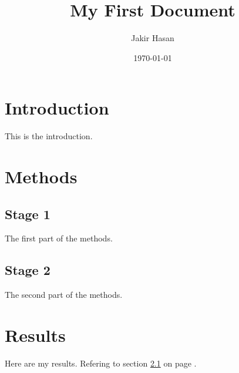 \documentclass[a4paper, 12pt]{article}
\begin{document}
\title{My First Document}
\author{Jakir Hasan}
\date{\today}
\maketitle

\tableofcontents
\newpage
{}

\section{Introduction}
This is the introduction.

\section{Methods}

\subsection{Stage 1}
\label{sec1}
The first part of the methods.

\subsection{Stage 2}
The second part of the methods.

\section{Results}
Here are my results. Refering to section \ref{sec1} on page \pageref{sec1}.
\end{document}
